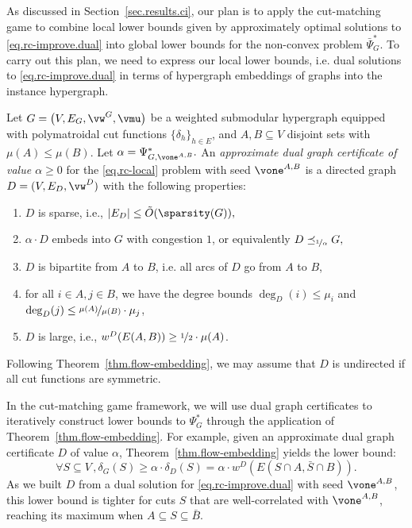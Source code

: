 \documentclass[letterpaper]{article}
\begin{document}
As discussed in Section~\ref{sec.results.ci}, our plan is to apply the cut-matching game to combine local lower bounds given by approximately optimal solutions to \eqref{eq.rc-improve.dual} into global lower bounds for the non-convex problem $\bar{\Psi}^*_{G}$.
To carry out this plan, we need to express our local lower bounds, i.e. dual solutions to \eqref{eq.rc-improve.dual} in terms of hypergraph embeddings of graphs into the instance hypergraph.
\begin{definition}
\label{def.graph}
Let $G = \big( V, E_G, \vw^G, \vmu \big)$ be a weighted submodular hypergraph equipped with polymatroidal cut functions $\{\delta_h\}_{h\in E}$, and $A,B \subseteq V$ disjoint sets with $\mu(A) \leq \mu(B).$ Let $\alpha = \Psi^*_{G, \vone^{A,B}}.$
An \emph{approximate dual graph certificate of value $\alpha \geq 0$} for the \eqref{eq.rc-local} problem with seed $\vone^{A,B}$ is a directed graph $D=(V,E_D, \vw^D)$ with the following properties:
\begin{enumerate}
    \item $D$ is sparse, i.e., $|E_D| \leq \tilde{O}(\sparsity(G)),$
    \item $\alpha \cdot D$ embeds into $G$ with congestion $1$, or equivalently $D \preceq_{\nicefrac{1}{\alpha}} G,$
    \item $D$ is bipartite from $A$ to $B$, i.e. all arcs of $D$ go from $A$ to $B$,
    \item for all $i \in A, j \in B$, we have the degree bounds $\deg_D(i) \leq \mu_i$ and $\deg_D(j) \leq \nicefrac{\mu(A)}{\mu(B)} \cdot \mu_j$,
    \item $D$ is large, i.e., $w^D(E(A,B)) \geq \nicefrac{1}{2} \cdot \mu(A)$.
\end{enumerate}
Following Theorem~\ref{thm.flow-embedding}, we may assume that $D$ is undirected if all cut functions are symmetric.
\end{definition}
In the cut-matching game framework, we will use  dual graph certificates to iteratively construct lower bounds to $\Psi^*_G$ through the application of Theorem~\ref{thm.flow-embedding}.
For example, given an approximate dual graph certificate $D$ of value $\alpha$, Theorem~\ref{thm.flow-embedding} yields the lower bound:
$$
\forall S \subseteq V\,, \delta_G(S) \geq \alpha \cdot \delta_D(S) = \alpha \cdot w^D(E(S \cap A, \bar{S} \cap B)).
$$
As we built $D$ from a dual solution for \eqref{eq.rc-improve.dual} with seed $\vone^{A,B}$, this lower bound is tighter for cuts $S$ that are well-correlated with $\vone^{A,B}$, reaching its maximum when $A \subseteq S \subseteq \bar{B}.$
\end{document}
